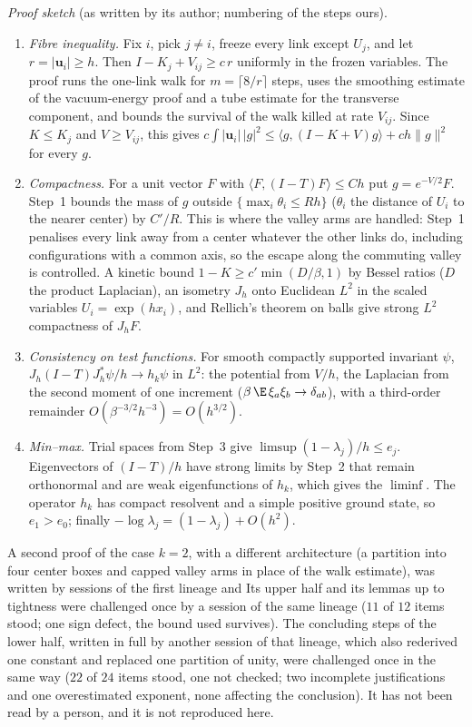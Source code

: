 \emph{Proof sketch} (as written by its author; numbering of the steps ours).
\begin{enumerate}
\item \emph{Fibre inequality.} Fix $i$, pick $j\ne i$, freeze every link except $U_j$, and let
$r=|\mathbf u_i|\ge h$. Then $I-K_j+V_{ij}\ge c\,r$ uniformly in the frozen variables. The proof runs the
one-link walk for $m=\lceil 8/r\rceil$ steps, uses the smoothing estimate of the vacuum-energy proof and a
tube estimate for the transverse component, and bounds the survival of the walk killed at rate $V_{ij}$.
Since $K\le K_j$ and $V\ge V_{ij}$, this gives
$c\int|\mathbf u_i|\,|g|^2\le\langle g,(I-K+V)g\rangle+ch\|g\|^2$ for every $g$.
\item \emph{Compactness.} For a unit vector $F$ with $\langle F,(I-T)F\rangle\le Ch$ put $g=e^{-V/2}F$.
Step~1 bounds the mass of $g$ outside $\{\max_i\theta_i\le Rh\}$ ($\theta_i$ the distance of $U_i$ to
the nearer center) by $C'/R$. This is where the valley arms are handled: Step~1 penalises every link
away from a center whatever the other links do, including configurations with a common axis, so the
escape along the commuting valley is controlled. A kinetic bound $1-K\ge c'\min(D/\beta,1)$ by Bessel
ratios ($D$ the product Laplacian), an isometry $J_h$ onto Euclidean $L^2$ in the scaled variables
$U_i=\exp(hx_i)$, and Rellich's theorem on balls give strong $L^2$ compactness of $J_hF$.
\item \emph{Consistency on test functions.} For smooth compactly supported invariant $\psi$,
$J_h(I-T)J_h^*\psi/h\to h_k\psi$ in $L^2$: the potential from $V/h$, the Laplacian from the second
moment of one increment ($\beta\,\E\,\xi_a\xi_b\to\delta_{ab}$), with a third-order remainder
$O(\beta^{-3/2}h^{-3})=O(h^{3/2})$.
\item \emph{Min--max.} Trial spaces from Step~3 give $\limsup(1-\lambda_j)/h\le e_j$. Eigenvectors of
$(I-T)/h$ have strong limits by Step~2 that remain orthonormal and are weak eigenfunctions of $h_k$, which
gives the $\liminf$. The operator $h_k$ has compact resolvent and a simple positive ground state, so
$e_1>e_0$; finally $-\log\lambda_j=(1-\lambda_j)+O(h^2)$.
\end{enumerate}

A second proof of the case $k=2$, with a different architecture (a partition into four center boxes and
capped valley arms in place of the walk estimate), was written by sessions of the first lineage and
Its upper half and its lemmas up to tightness were challenged once by a session of the same lineage
($11$ of $12$ items stood; one sign defect, the bound used survives). The concluding steps of the lower half,
written in full by another session of that lineage, which also rederived one constant and replaced one
partition of unity, were challenged once in the same way ($22$ of $24$ items stood, one not checked; two
incomplete justifications and one overestimated exponent, none affecting the conclusion). It has not been read by a person, and it is not reproduced here.

